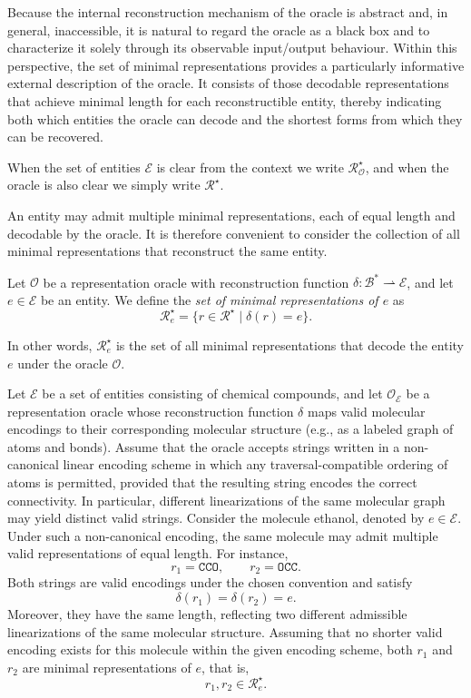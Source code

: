 Because the internal reconstruction mechanism of the oracle is abstract and, in general, inaccessible, it is natural to regard the oracle as a black box and to characterize it solely through its observable input/output behaviour. Within this perspective, the set of minimal representations provides a particularly informative external description of the oracle. It consists of those decodable representations that achieve minimal length for each reconstructible entity, thereby indicating both which entities the oracle can decode and the shortest forms from which they can be recovered.

\begin{notation}
When the set of entities $\mathcal{E}$ is clear from the context we write $\mathcal{R}^{\star}_{\mathcal{O}}$, and when the oracle is also clear we simply write $\mathcal{R}^{\star}$.
\end{notation}

An entity may admit multiple minimal representations, each of equal length and decodable by the oracle. It is therefore convenient to consider the collection of all minimal representations that reconstruct the same entity.

\begin{definition}
Let $\mathcal{O}$ be a representation oracle with reconstruction function $\delta : \mathcal{B}^\ast \rightharpoonup \mathcal{E}$, and let $e \in \mathcal{E}$ be an entity. We define the \emph{set of minimal representations of $e$} as
\[
\mathcal{R}^{\star}_{e} = \bigl\{r \in \mathcal{R}^{\star} \;\big|\; \delta(r)=e \bigr\}.
\]
\end{definition}

\noindent
In other words, $\mathcal{R}^{\star}_{e}$ is the set of all minimal representations that decode the entity $e$ under the oracle $\mathcal{O}$.

\begin{example}
Let $\mathcal{E}$ be a set of entities consisting of chemical compounds, and let $\mathcal{O}_{\mathcal{E}}$ be a representation oracle whose reconstruction function $\delta$ maps valid molecular encodings to their corresponding molecular structure (e.g., as a labeled graph of atoms and bonds). Assume that the oracle accepts strings written in a non-canonical linear encoding scheme in which any traversal-compatible ordering of atoms is permitted, provided that the resulting string encodes the correct connectivity. In particular, different linearizations of the same molecular graph may yield distinct valid strings. Consider the molecule ethanol, denoted by $e \in \mathcal{E}$. Under such a non-canonical encoding, the same molecule may admit multiple valid representations of equal length. For instance,
\[
r_1 = \texttt{CCO}, \qquad r_2 = \texttt{OCC}.
\]
Both strings are valid encodings under the chosen convention and satisfy
\[
\delta(r_1)=\delta(r_2)=e.
\]
Moreover, they have the same length, reflecting two different admissible linearizations of the same molecular structure. Assuming that no shorter valid encoding exists for this molecule within the given encoding scheme, both $r_1$ and $r_2$ are minimal representations of $e$, that is,
\[
r_1, r_2 \in \mathcal{R}^\star_e.
\]
\end{example} 


